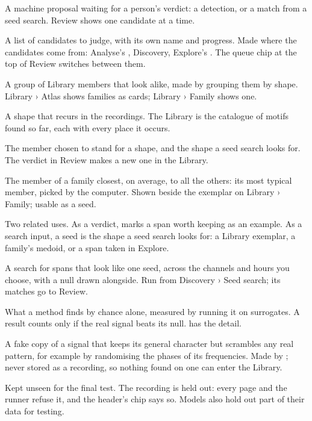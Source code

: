 \begin{glossarylist}
 A machine proposal waiting for a person's verdict: a
detection, or a match from a seed search. Review shows one candidate at a time.

 A list of candidates to judge, with its own name and
progress. Made where the candidates come from: Analyse's , Discovery,
Explore's . The queue chip at the top of Review switches between
them.

 A group of Library members that look alike, made by grouping
them by shape. Library › Atlas shows families as cards; Library › Family shows one.

 A shape that recurs in the recordings. The Library is the catalogue
of motifs found so far, each with every place it occurs.

 The member chosen to stand for a shape, and the shape a seed
search looks for. The  verdict in Review makes a new one in the Library.

 The member of a family closest, on average, to all the others:
its most typical member, picked by the computer. Shown beside the exemplar on Library ›
Family; usable as a seed.

 Two related uses. As a verdict,  marks a span worth keeping
as an example. As a search input, a seed is the shape a seed search looks for: a Library
exemplar, a family's medoid, or a span taken in Explore.

 A search for spans that look like one seed, across the
channels and hours you choose, with a null drawn alongside. Run from Discovery › Seed
search; its matches go to Review.

 What a method finds by chance alone, measured by running it on
surrogates. A result counts only if the real signal beats its null.  has the
detail.

 A fake copy of a signal that keeps its general character
but scrambles any real pattern, for example by randomising the phases of its frequencies.
Made by ; never stored as a recording, so nothing found on
one can enter the Library.

 Kept unseen for the final test. The recording
 is held out: every page and the runner refuse it, and the header's
 chip says so. Models also hold out part of their data for testing.


\end{glossarylist}

